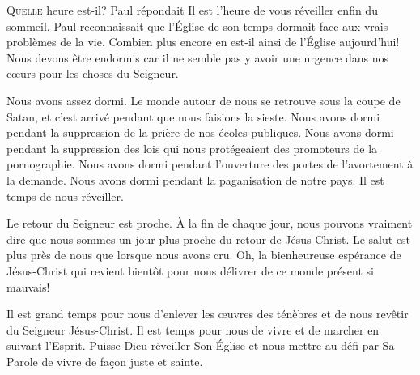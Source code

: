 \dvrule







\lettrine{Q}{uelle} heure est-il?
 Paul répondait\frcolon{} 
 \Og Il est l'heure de vous réveiller enfin du sommeil. \Fg{}
 Paul reconnaissait que l'Église  de son temps
 dormait face aux vrais problèmes de la vie.
 Combien plus encore en est-il ainsi de l'Église  aujourd'hui!
 Nous devons être endormis car il ne semble pas y avoir une urgence
 dans nos c\oe{}urs pour les choses du Seigneur.

Nous avons assez dormi. Le monde autour de nous se retrouve sous la coupe de Satan,
 et c'est arrivé pendant que nous faisions la sieste.
 Nous avons dormi pendant la suppression de la prière
 de nos écoles publiques. Nous avons dormi pendant la suppression
 des lois qui nous protégeaient des promoteurs de la pornographie.
 Nous avons dormi pendant l'ouverture des portes de l'avortement à la demande.
 Nous avons dormi pendant la paganisation de notre pays.
 Il est temps de nous réveiller.


Le retour du Seigneur est proche.
 À la fin de chaque jour, nous pouvons vraiment dire que nous sommes
 un jour plus proche du retour de Jésus-Christ.
 Le salut est plus près de nous que lorsque nous avons cru.
 Oh, la bienheureuse espérance de Jésus-Christ qui revient bientôt
 pour nous délivrer de ce monde présent si mauvais!

Il est grand temps pour nous d'enlever les \oe{}uvres des ténèbres
 et de nous revêtir du Seigneur Jésus-Christ.
 Il est temps pour nous de vivre et de marcher en suivant l'Esprit.
 Puisse Dieu réveiller Son Église 
 et nous mettre au défi par Sa Parole de vivre de fa\c{c}on juste et sainte.

